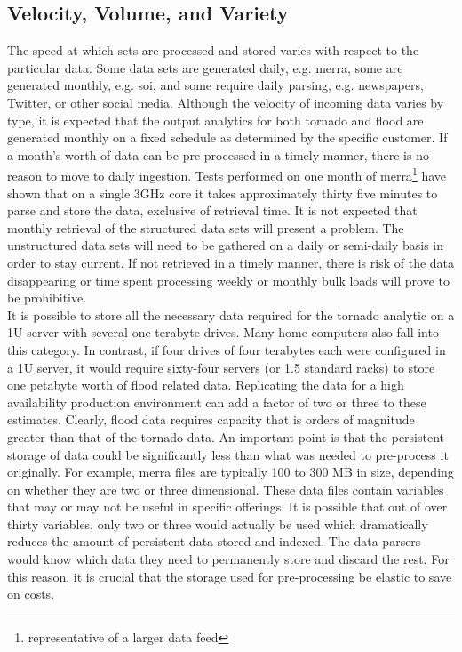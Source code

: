 \subsection{Velocity, Volume, and Variety}
The speed at which sets are processed and stored varies with respect to the particular data. Some data sets are generated daily, e.g. \gls{merra}, some are generated monthly, e.g. \gls{soi}, and some require daily parsing, e.g. newspapers, Twitter, or other social media. Although the velocity of incoming data varies by type, it is expected that the output analytics for both tornado and flood are generated monthly on a fixed schedule as determined by the specific customer. If a month's worth of data can be pre-processed in a timely manner, there is no reason to move to daily ingestion. Tests performed on one month of \gls{merra}\footnote{representative of a larger data feed} have shown that on a single 3GHz core it takes approximately thirty five minutes to parse and store the data, exclusive of retrieval time. It is not expected that monthly retrieval of the structured data sets will present a problem. The unstructured data sets will need to be gathered on a daily or semi-daily basis in order to stay current. If not retrieved in a timely manner, there is risk of the data disappearing or time spent processing weekly or monthly bulk loads will prove to be prohibitive.\\

It is possible to store all the necessary data required for the tornado analytic on a 1U server with several one terabyte drives. Many home computers also fall into this category. In contrast, if four drives of four terabytes each were configured in a 1U server, it would require sixty-four servers  (or 1.5 standard racks) to store one petabyte worth of flood related data. Replicating the data for a high availability production environment can add a factor of two or three to these estimates. Clearly, flood data requires capacity that is orders of magnitude greater than that of the tornado data. An important point is that the persistent storage of data could be significantly less than what was needed to pre-process it originally. For example, \gls{merra} files are typically 100 to 300 MB in size, depending on whether they are two or three dimensional. These data files contain variables that may or may not be useful in specific offerings. It is possible that out of over thirty variables, only two or three would actually be used which dramatically reduces the amount of persistent data stored and indexed. The data parsers would know which data they need to permanently store and discard the rest. For this reason, it is crucial that the storage used for pre-processing be elastic to save on costs.\\

